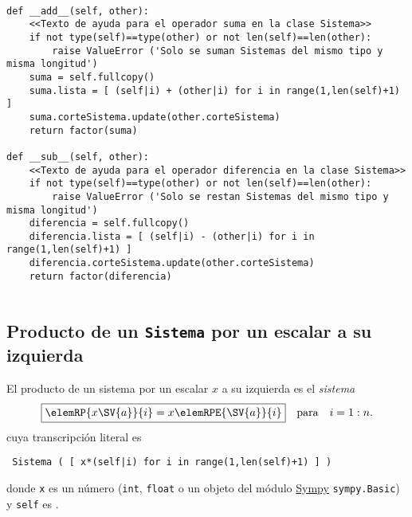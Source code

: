 \documentclass[11pt]{report}
\begin{document}
\begin{verbatim}

def __add__(self, other):
    <<Texto de ayuda para el operador suma en la clase Sistema>>
    if not type(self)==type(other) or not len(self)==len(other):
        raise ValueError ('Solo se suman Sistemas del mismo tipo y misma longitud')
    suma = self.fullcopy()
    suma.lista = [ (self|i) + (other|i) for i in range(1,len(self)+1) ]
    suma.corteSistema.update(other.corteSistema)
    return factor(suma)
            
def __sub__(self, other):
    <<Texto de ayuda para el operador diferencia en la clase Sistema>>
    if not type(self)==type(other) or not len(self)==len(other):
        raise ValueError ('Solo se restan Sistemas del mismo tipo y misma longitud')
    diferencia = self.fullcopy()
    diferencia.lista = [ (self|i) - (other|i) for i in range(1,len(self)+1) ]
    diferencia.corteSistema.update(other.corteSistema)
    return factor(diferencia)
            
\end{verbatim}

\subsection{Producto de un \texttt{Sistema} por un escalar a su izquierda}
\label{sec:orgfa95242}

El producto de un sistema  por un escalar \(x\) a su izquierda es
el \emph{sistema}
\begin{displaymath}
  \fbox{\begin{math} 
      \elemRP{x\SV{a}}{i}=x \elemRPE{\SV{a}}{i}
  \end{math}}\quad\text{para}\quad i=1:n.
\end{displaymath}
cuya transcripción literal es
\begin{center}
  \Verb/ Sistema ( [ x*(self|i) for i in range(1,len(self)+1) ] ) /
\end{center}

donde \texttt{x} es un número (\texttt{int}, \texttt{float} o un objeto del módulo \href{https://docs.sympy.org/latest/index.html}{Sympy}
\texttt{sympy.Basic}) y \texttt{self} es .
\end{document}
